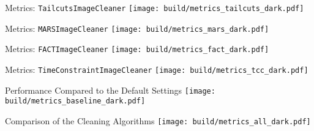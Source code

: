 \begin{frame}{Metrics: \texttt{TailcutsImageCleaner}}
    \centering
    \texttt{[image: build/metrics\_tailcuts\_dark.pdf]}
\end{frame}

\begin{frame}{Metrics: \texttt{MARSImageCleaner}}
    \centering
    \texttt{[image: build/metrics\_mars\_dark.pdf]}
\end{frame}

\begin{frame}{Metrics: \texttt{FACTImageCleaner}}
    \vspace{-0.355cm}
    \centering
    \texttt{[image: build/metrics\_fact\_dark.pdf]}
\end{frame}

\begin{frame}{Metrics: \texttt{TimeConstraintImageCleaner}}
    \vspace{-0.15cm}
    \centering
    \texttt{[image: build/metrics\_tcc\_dark.pdf]}
\end{frame}

\begin{frame}{Performance Compared to the Default Settings}
    \centering
    \texttt{[image: build/metrics\_baseline\_dark.pdf]}
\end{frame}

\begin{frame}{Comparison of the Cleaning Algorithms}
    \centering
    \texttt{[image: build/metrics\_all\_dark.pdf]}
\end{frame}